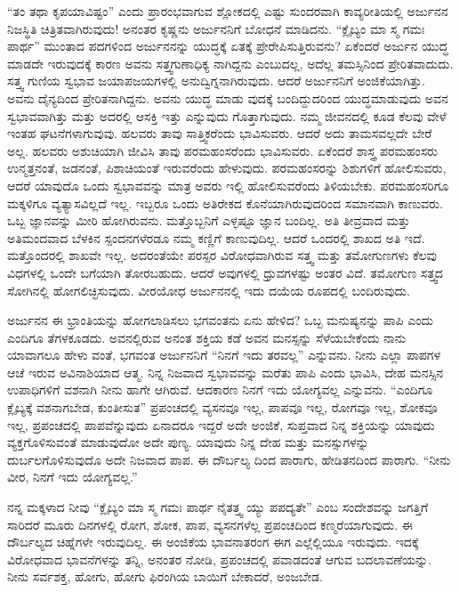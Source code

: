 “ತಂ ತಥಾ ಕೃಪಯಾವಿಷ್ಟಂ” ಎಂದು ಪ್ರಾರಂಭವಾಗುವ ಶ್ಲೋಕದಲ್ಲಿ ಎಷ್ಟು ಸುಂದರವಾಗಿ ಕಾವ್ಯರೀತಿಯಲ್ಲಿ ಅರ್ಜುನನ ನಿಜಸ್ಥಿತಿ ಚಿತ್ರಿತವಾಗಿರುವುದು! ಅನಂತರ ಕೃಷ್ಣನು ಅರ್ಜುನನಿಗೆ ಬೋಧನೆ ಮಾಡಿದನು. “ಕ್ಲೈಬ್ಯಂ ಮಾ ಸ್ಮ ಗಮಃ ಪಾರ್ಥ” ಮುಂತಾದ ಪದಗಳಿಂದ ಅರ್ಜುನನನ್ನು ಯುದ್ಧಕ್ಕೆ ಏತಕ್ಕೆ ಪ್ರೇರೇಪಿಸುತ್ತಿರುವನು? ಏಕೆಂದರೆ ಅರ್ಜುನ ಯುದ್ಧ ಮಾಡದೇ ಇರುವುದಕ್ಕೆ ಕಾರಣ ಅವನು ಸತ್ತ್ವಗುಣಾಧಿಕ್ಯ ನಾಗಿದ್ದನು ಎಂಬುದಲ್ಲ, ಅದೆಲ್ಲ ತಮಸ್ಸಿನಿಂದ ಪ್ರೇರಿತವಾದುದು. ಸತ್ತ್ವ ಗುಣಿಯ ಸ್ವಭಾವ ಜಯಾಪಜಯಗಳಲ್ಲಿ ಅನುದ್ವಿಗ್ನನಾಗಿರುವುದು. ಆದರೆ ಅರ್ಜುನನಿಗೆ ಅಂಜಿಕೆಯಾಗಿತ್ತು. ಅವನು ದೈನ್ಯದಿಂದ ಪ್ರೇರಿತನಾಗಿದ್ದನು. ಅವನು ಯುದ್ಧ ಮಾಡು ವುದಕ್ಕೆ ಬಂದಿದ್ದುದರಿಂದ ಯುದ್ಧಮಾಡುವುದು ಅವನ ಸ್ವಭಾವವಾಗಿತ್ತು ಮತ್ತು ಅದರಲ್ಲಿ ಆಸಕ್ತಿ ಇತ್ತು ಎನ್ನುವುದು ಗೊತ್ತಾಗುವುದು. ನಮ್ಮ ಜೀವನದಲ್ಲಿ ಕೂಡ ಕೆಲವು ವೇಳೆ ಇಂತಹ ಘಟನೆಗಳಾಗುವುವು. ಹಲವರು ತಾವು ಸಾತ್ತ್ವಿಕರೆಂದು ಭಾವಿಸುವರು. ಆದರೆ ಅದು ತಾಮಸವಲ್ಲದೇ ಬೇರೆ ಅಲ್ಲ. ಹಲವರು ಅಶುಚಿಯಾಗಿ ಜೀವಿಸಿ ತಾವು ಪರಮಹಂಸರೆಂದು ಭಾವಿಸುವರು. ಏಕೆಂದರೆ ಶಾಸ್ತ್ರ ಪರಮಹಂಸರು ಉನ್ಮತ್ತನಂತೆ, ಜಡನಂತೆ, ಪಿಶಾಚಿಯಂತೆ ಇರುವರೆಂದು ಹೇಳುವುದು. ಪರಮಹಂಸರನ್ನು ಶಿಶುಗಳಿಗೆ ಹೋಲಿಸುವರು, ಆದರೆ ಯಾವುದೊ ಒಂದು ಸ್ವಭಾವವನ್ನು ಮಾತ್ರ ಅವರು ಇಲ್ಲಿ ಹೋಲಿಸುವರೆಂದು ತಿಳಿಯಬೇಕು. ಪರಮಹಂಸರಿಗೂ ಮಕ್ಕಳಿಗೂ ವ್ಯತ್ಯಾಸವಿಲ್ಲದೆ ಇಲ್ಲ. ಇಬ್ಬರೂ ಒಂದು ಅತಿರೇಕದ ಕೊನೆಯಾಗಿರುವುದರಿಂದ ಸಮಾನವಾಗಿ ಕಾಣುವರು. ಒಬ್ಬ ಜ್ಞಾನವನ್ನು ಮೀರಿ ಹೋಗಿರುವನು. ಮತ್ತೊಬ್ಬನಿಗೆ ಎಳ್ಳಷ್ಟೂ ಜ್ಞಾನ ಬಂದಿಲ್ಲ. ಅತಿ ತೀವ್ರವಾದ ಮತ್ತು ಅತಿಮಂದವಾದ ಬೆಳಕಿನ ಸ್ಪಂದನಗಳೆರಡೂ ನಮ್ಮ ಕಣ್ಣಿಗೆ ಕಾಣುವುದಿಲ್ಲ. ಆದರೆ ಒಂದರಲ್ಲಿ ಶಾಖದ ಅತಿ ಇದೆ. ಮತ್ತೊಂದರಲ್ಲಿ ಶಾಖವೇ ಇಲ್ಲ. ಅದರಂತೆಯೇ ಪರಸ್ಪರ ವಿರೋಧವಾಗಿರುವ ಸತ್ತ್ವ ಮತ್ತು ತಮೋಗುಣಗಳು ಕೆಲವು ವಿಧಗಳಲ್ಲಿ ಒಂದೇ ಬಗೆಯಾಗಿ ತೋರಬಹುದು. ಆದರೆ ಅವುಗಳಲ್ಲಿ ಧ್ರುವಗಳಷ್ಟು ಅಂತರ ವಿದೆ. ತಮೋಗುಣ ಸತ್ತ್ವದ ಸೋಗಿನಲ್ಲಿ ಹೋಗಲಿಚ್ಛಿಸುವುದು. ವೀರಯೋಧ ಅರ್ಜುನನಲ್ಲಿ ಇದು ದಯೆಯ ರೂಪದಲ್ಲಿ ಬಂದಿರುವುದು.

ಅರ್ಜುನನ ಈ ಭ್ರಾಂತಿಯನ್ನು ಹೋಗಲಾಡಿಸಲು ಭಗವಂತನು ಏನು ಹೇಳಿದ? ಒಬ್ಬ ಮನುಷ್ಯನನ್ನು ಪಾಪಿ ಎಂದು ಎಂದಿಗೂ ತೆಗಳಕೂಡದು. ಅವನಲ್ಲಿರುವ ಅನಂತ ಶಕ್ತಿಯ ಕಡೆ ಅವನ ಮನಸ್ಸನ್ನು ಸೆಳೆಯಬೇಕೆಂದು ನಾನು ಯಾವಾಗಲೂ ಹೇಳು ವಂತೆ, ಭಗವಂತ ಅರ್ಜುನನಿಗೆ “ನಿನಗೆ ಇದು ತರವಲ್ಲ” ಎನ್ನುವನು. ನೀನು ಎಲ್ಲಾ ಪಾಪಗಳ ಆಚೆ ಇರುವ ಅವಿನಾಶಿಯಾದ ಆತ್ಮ. ನಿನ್ನ ನಿಜವಾದ ಸ್ವಭಾವವನ್ನು ಮರೆತು ಪಾಪಿ ಎಂದು ಭಾವಿಸಿ, ದೇಹ ಮನಸ್ಸಿನ ಉಪಾಧಿಗಳಿಗೆ ವಶನಾಗಿ ನೀನು ಹಾಗೇ ಆಗಿರುವೆ. ಆದಕಾರಣ ನಿನಗೆ ಇದು ಯೋಗ್ಯವಲ್ಲ ಎನ್ನುವನು. “ಎಂದಿಗೂ ಕ್ಲೈಬ್ಯಕ್ಕೆ ವಶನಾಗಬೇಡ, ಕುಂತೀಸುತ” ಪ್ರಪಂಚದಲ್ಲಿ ವ್ಯಸನವೂ ಇಲ್ಲ, ಪಾಪವೂ ಇಲ್ಲ, ರೋಗವೂ ಇಲ್ಲ, ಶೋಕವೂ ಇಲ್ಲ, ಪ್ರಪಂಚದಲ್ಲಿ ಪಾಪವೆನ್ನುವುದು ಏನಾದರೂ ಇದ್ದರೆ ಅದೇ ಅಂಜಿಕೆ, ಸುಪ್ತವಾದ ನಿನ್ನ ಶಕ್ತಿಯನ್ನು ಯಾವುದು ವ್ಯಕ್ತಗೊಳಿಸುವಂತೆ ಮಾಡುವುದೋ ಅದೇ ಪುಣ್ಯ. ಯಾವುದು ನಿನ್ನ ದೇಹ ಮತ್ತು ಮನಸ್ಸುಗಳನ್ನು ದುರ್ಬಲಗೊಳಿಸುವುದೊ ಅದೇ ನಿಜವಾದ ಪಾಪ. ಈ ದೌರ್ಬಲ್ಯ ದಿಂದ ಪಾರಾಗು, ಹೇಡಿತನದಿಂದ ಪಾರಾಗು. “ನೀನು ವೀರ, ನಿನಗೆ ಇದು ಯೋಗ್ಯವಲ್ಲ.”

ನನ್ನ ಮಕ್ಕಳಾದ ನೀವು “ಕ್ಲೈಬ್ಯಂ ಮಾ ಸ್ಮ ಗಮಃ ಪಾರ್ಥ ನೈತತ್ತ್ವ ಯ್ಯು ಪಪದ್ಯತೇ” ಎಂಬ ಸಂದೇಶವನ್ನು ಜಗತ್ತಿಗೆ ಸಾರಿದರೆ ಮೂರು ದಿನಗಳಲ್ಲಿ ರೋಗ, ಶೋಕ, ಪಾಪ, ವ್ಯಸನಗಳೆಲ್ಲ ಪ್ರಪಂಚದಿಂದ ಕಣ್ಮರೆಯಾಗುವುದು. ಈ ದೌರ್ಬಲ್ಯದ ಚಿಹ್ನೆಗಳೇ ಇರುವುದಿಲ್ಲ. ಈ ಅಂಜಿಕೆಯ ಭಾವನಾತರಂಗ ಈಗ ಎಲ್ಲೆಲ್ಲಿಯೂ ಇರುವುದು. ಇದಕ್ಕೆ ವಿರೋಧವಾದ ಭಾವನೆಗಳನ್ನು ತನ್ನಿ, ಅನಂತರ ನೋಡಿ, ಪ್ರಪಂಚದಲ್ಲಿ ಪವಾಡದಂತೆ ಆಗುವ ಬದಲಾವಣೆಯನ್ನು. ನೀನು ಸರ್ವಶಕ್ತ, ಹೋಗು, ಹೋಗು ಫಿರಂಗಿಯ ಬಾಯಿಗೆ ಬೇಕಾದರೆ, ಅಂಜಬೇಡ.

